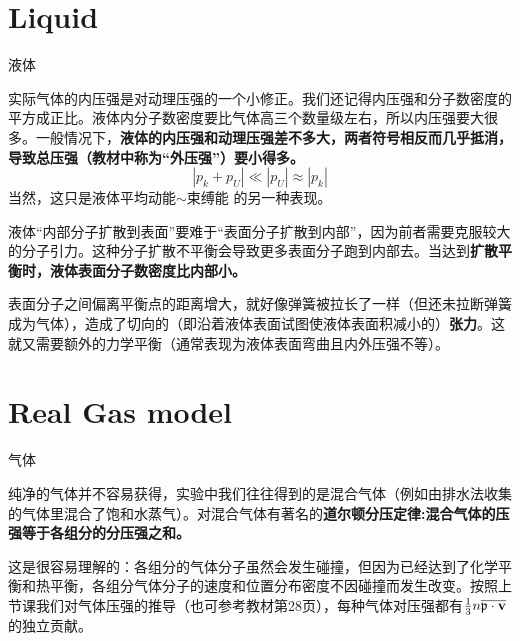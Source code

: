 \documentclass[CJK]{beamer}
\begin{document}
\section{Liquid}


\begin{frame}
  \bch
  \begin{center}
    \Huge{液体}
    \end{center}    
\ech
\end{frame}

\begin{frame}
\bch
实际气体的内压强是对动理压强的一个小修正。我们还记得内压强和分子数密度的平方成正比。液体内分子数密度要比气体高三个数量级左右，所以内压强要大很多。一般情况下，{\bf 液体的内压强和动理压强差不多大，两者符号相反而几乎抵消，导致总压强（教材中称为“外压强”）要小得多。}
$$ |p_k + p_U| \ll |p_U|\approx |p_k|$$
当然，这只是液体平均动能$\sim$束缚能 的另一种表现。
\ech
\end{frame}


\begin{frame}
\bch
 液体“内部分子扩散到表面”要难于“表面分子扩散到内部”，因为前者需要克服较大的分子引力。这种分子扩散不平衡会导致更多表面分子跑到内部去。当达到{\bf 扩散平衡时，液体表面分子数密度比内部小。} 


表面分子之间偏离平衡点的距离增大，就好像弹簧被拉长了一样（但还未拉断弹簧成为气体），造成了切向的（即沿着液体表面试图使液体表面积减小的）{\bf 张力}。这就又需要额外的力学平衡（通常表现为液体表面弯曲且内外压强不等）。

\ech
\end{frame}


\section{Real Gas model}

\begin{frame}
  \bch
  \begin{center}
    \Huge{气体}
    \end{center}    
\ech
\end{frame}



\begin{frame}
\bch
纯净的气体并不容易获得，实验中我们往往得到的是混合气体（例如由排水法收集的气体里混合了饱和水蒸气）。对混合气体有著名的{\bf 道尔顿分压定律:混合气体的压强等于各组分的分压强之和。}

\skipline

这是很容易理解的：各组分的气体分子虽然会发生碰撞，但因为已经达到了化学平衡和热平衡，各组分气体分子的速度和位置分布密度不因碰撞而发生改变。按照上节课我们对气体压强的推导（也可参考教材第28页），每种气体对压强都有$\frac{1}{3}n\overline{\mathbf{\mathfrak{p}}\cdot{\mathbf{v}}}$ 的独立贡献。

\ech
\end{frame}
\end{document}

